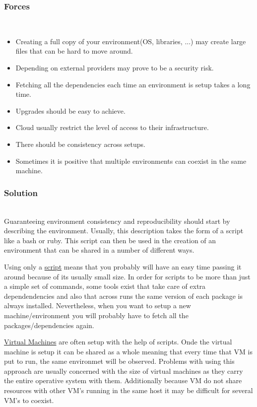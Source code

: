 \documentclass{llncs}
\begin{document}
		\subsubsection{Forces}~\\
			\begin{itemize}
				\item Creating a full copy of your environment(OS, libraries, ...) may create large files that can be hard to move around.
				\item Depending on external providers may prove to be a security risk.
				\item Fetching all the dependencies each time an environment is setup takes a long time.
				\item Upgrades should be easy to achieve.
				\item Cloud usually restrict the level of access to their infrastructure.
				\item There should be consistency across setups.
				\item Sometimes it is positive that multiple environments can coexist in the same machine.
			\end{itemize}
		\subsubsection{Solution}~\\
			Guaranteeing environment consistency and reproducibility should start by describing the environment. Usually, this description takes the form of a script like a bash or ruby. This script can then be used in the creation of an environment that can be shared in a number of different ways.

			Using only a \underline{script} means that you probably will have an easy time passing it around because of its usually small size. In order for scripts to be more than just a simple set of commands, some tools exist that take care of extra dependendencies and also that across runs the same version of each package is always installed. Nevertheless, when you want to setup a new machine/environment you will probably have to fetch all the packages/dependencies again.

			\underline{Virtual Machines} are often setup with the help of scripts. Onde the virtual machine is setup it can be shared as a whole meaning that every time that VM is put to run, the same environmet will be observed. Problems with using this approach are usually concerned with the size of virtual machines as they carry the entire operative system with them. Additionally because VM do not share resources with other VM's running in the same host it may be difficult for several VM's to coexist.
\end{document}
